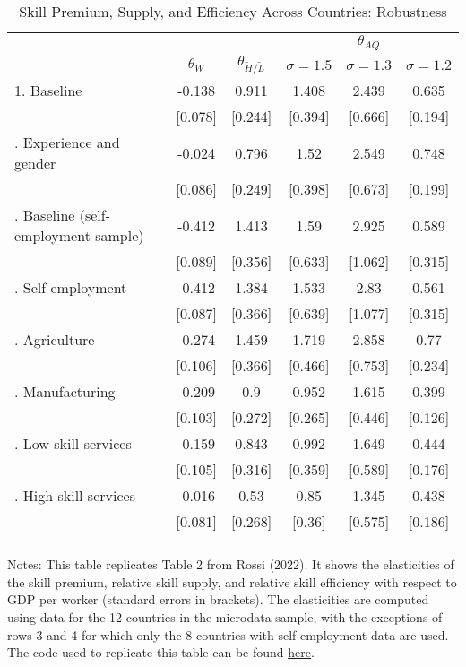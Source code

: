 \begin{table}
\centering
\begin{threeparttable}
\caption{Skill Premium, Supply, and Efficiency Across Countries: Robustness}
\centering
\fontsize{9}{11}\selectfont
\begin{tabular}[t]{lccccc}
\toprule
\multicolumn{3}{c}{\em{ }} & \multicolumn{3}{c}{\em{$\theta_{AQ}$}} \\
\cmidrule(l{3pt}r{3pt}){4-6}
 & $\theta_W$ & $\theta_{\tilde{H}/\tilde{L}}$ & $\sigma = 1.5$ & $\sigma = 1.3$ & $\sigma = 1.2$\\
\midrule
1. Baseline & -0.138 & 0.911 & 1.408 & 2.439 & 0.635\\
 & {}[0.078] & {}[0.244] & {}[0.394] & {}[0.666] & {}[0.194]\\
\addlinespace[5pt]
2. Experience and gender & -0.024 & 0.796 & 1.52 & 2.549 & 0.748\\
 & {}[0.086] & {}[0.249] & {}[0.398] & {}[0.673] & {}[0.199]\\
\addlinespace[5pt]
3. Baseline (self-employment sample) & -0.412 & 1.413 & 1.59 & 2.925 & 0.589\\
 & {}[0.089] & {}[0.356] & {}[0.633] & {}[1.062] & {}[0.315]\\
\addlinespace[5pt]
4. Self-employment & -0.412 & 1.384 & 1.533 & 2.83 & 0.561\\
 & {}[0.087] & {}[0.366] & {}[0.639] & {}[1.077] & {}[0.315]\\
\addlinespace[5pt]
5. Agriculture & -0.274 & 1.459 & 1.719 & 2.858 & 0.77\\
 & {}[0.106] & {}[0.366] & {}[0.466] & {}[0.753] & {}[0.234]\\
\addlinespace[5pt]
6. Manufacturing & -0.209 & 0.9 & 0.952 & 1.615 & 0.399\\
 & {}[0.103] & {}[0.272] & {}[0.265] & {}[0.446] & {}[0.126]\\
\addlinespace[5pt]
7. Low-skill services & -0.159 & 0.843 & 0.992 & 1.649 & 0.444\\
 & {}[0.105] & {}[0.316] & {}[0.359] & {}[0.589] & {}[0.176]\\
\addlinespace[5pt]
8. High-skill services & -0.016 & 0.53 & 0.85 & 1.345 & 0.438\\
 & {}[0.081] & {}[0.268] & {}[0.36] & {}[0.575] & {}[0.186]\\
\addlinespace[5pt]
\bottomrule
\end{tabular}
\begin{tablenotes}
\small
\item [] \scriptsize Notes: This table replicates Table 2 from Rossi (2022). It shows the elasticities of the skill premium, relative skill supply, and relative skill efficiency with respect to GDP per worker (standard errors in brackets). The elasticities are computed using data for the 12 countries in the microdata sample, with the exceptions of rows 3 and 4 for which only the 8 countries with self-employment data are used. The code used to replicate this table can be found \underline{\href{https://github.com/glpousse/devpkg/blob/main/Code/Tables/Table_2.r}{here}}.
\end{tablenotes}
\end{threeparttable}
\end{table}
